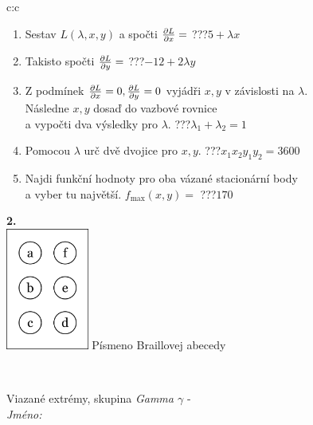 \documentclass[10pt]{report}
\begin{document}
\begin{tabular}{c:c}
\begin{minipage}[c][104.5mm][t]{0.5\linewidth}
\begin{center}
\begin{minipage}{0.79\linewidth}
\begin{center}
\begin{varwidth}{\linewidth}
\begin{enumerate}
\item Sestav $L(\lambda,x,y)$ a spočti $\pdv{L}{x}=$\quad \dotfill\; ???\;\dotfill \quad $5+\lambda x$
\item Takisto spočti $\pdv{L}{y}=$\quad \dotfill\; ???\;\dotfill \quad $-12+2\lambda y$
\item Z podmínek $\pdv{L}{x}=0 , \pdv{L}{y}=0$ vyjádři $x,y$ v závislosti na $\lambda$.\\ \phantom{xxxxxx}Následne $x,y$ dosaď do vazbové rovnice\\ \phantom{xxxxxx}a vypočti dva výsledky pro $\lambda$.\quad \dotfill\; ???\;\dotfill \quad $\lambda_1+\lambda_2=1$
\item Pomocou $\lambda$ urč dvě dvojice pro $x,y$.\quad \dotfill\; ???\;\dotfill \quad $x_1 x_2 y_1 y_2=3600$
\item Najdi funkční hodnoty pro oba vázané stacionární body\\ \phantom{xxxxxx}a vyber tu najvětší. $f_{\text{max}}(x,y)=$\quad \dotfill\; ???\;\dotfill \quad $170$
\end{enumerate}
\end{varwidth}
\end{center}
\end{minipage}
\begin{minipage}{0.20\linewidth}
\begin{center}
{\Huge\bfseries 2.} \\[2mm]
\includegraphics[height=40mm]{../images/braille.png}
{\small Písmeno Braillovej abecedy}
\end{center}
\end{minipage}
\end{center}
\end{minipage}
\\ \hdashline
\begin{minipage}[c][104.5mm][t]{0.5\linewidth}
\begin{center}
\vspace{7mm}
{\huge Viazané extrémy, skupina \textit{Gamma $\gamma$} -}\\[5mm]
\textit{Jméno:}\phantom{xxxxxxxxxxxxxxxxxxxxxxxxxxxxxxxxxxxxxxxxxxxxxxxxxxxxxxxxxxxxxxxxx}\\[5mm]

\end{center}
\end{minipage}
\end{tabular}
\end{document}
